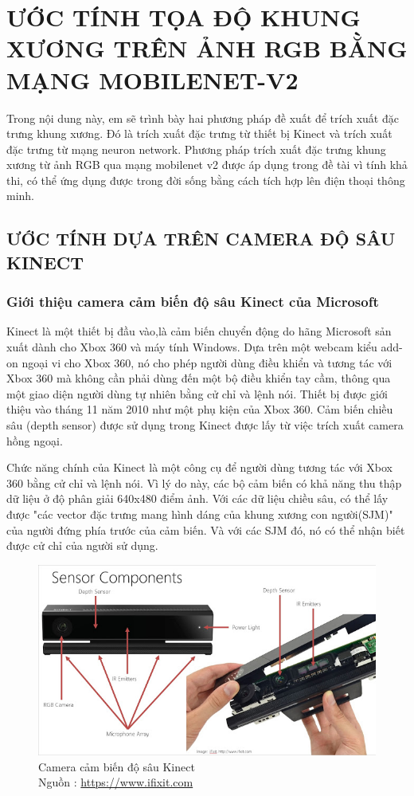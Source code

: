 \chapter{ƯỚC TÍNH TỌA ĐỘ KHUNG XƯƠNG TRÊN ẢNH RGB BẰNG MẠNG MOBILENET-V2}
\label{s:pose estimate}
Trong nội dung này, em sẽ trình bày hai phương pháp đề xuất để trích xuất đặc trưng khung xương. Đó là trích xuất đặc trưng từ thiết bị Kinect và trích xuất đặc trưng từ mạng neuron network. Phương pháp trích xuất đặc trưng khung xương từ ảnh RGB qua mạng mobilenet v2 được áp dụng trong đề tài vì tính khả thi, có thể ứng dụng được trong đời sống bằng cách tích hợp lên điện thoại thông minh.

\section{ƯỚC TÍNH DỰA TRÊN CAMERA ĐỘ SÂU KINECT}
\label{ss:kinect}
\subsection{Giới thiệu camera cảm biến độ sâu Kinect của Microsoft}
Kinect là một thiết bị đầu vào,là cảm biến chuyển động do hãng Microsoft sản xuất dành cho Xbox 360 và máy tính Windows. Dựa trên một webcam kiểu add-on ngoại vi cho Xbox 360, nó cho phép người dùng điều khiển và tương tác với Xbox 360 mà không cần phải dùng đến một bộ điều khiển tay cầm, thông qua một giao diện người dùng tự nhiên bằng cử chỉ và lệnh nói. Thiết bị được giới thiệu vào tháng 11 năm 2010 như một phụ kiện của Xbox 360. Cảm biến chiều sâu (depth sensor) được sử dụng trong Kinect được lấy từ việc trích xuất camera hồng ngoại. 

Chức năng chính của Kinect là một công cụ để người dùng tương tác với Xbox 360 bằng cử chỉ và lệnh nói. Vì lý do này, các bộ cảm biến có khả năng thu thập dữ liệu ở độ phân giải 640x480 điểm ảnh. Với các dữ liệu chiều sâu, có thể lấy được "các vector đặc trưng mang hình dáng của khung xương con người(SJM)" của người đứng phía trước của cảm biến. Và với các SJM đó, nó có thể nhận biết được cử chỉ của người sử dụng.

\FloatBarrier
\begin{figure}[htp]
\begin{center}
\includegraphics[scale=0.8]{chap3/c3_figs/kinect.png}
\end{center}
\caption{Camera cảm biến độ sâu Kinect \\Nguồn : \url{https://www.ifixit.com}}
\label{fig:kinect}
\end{figure}
\FloatBarrier

